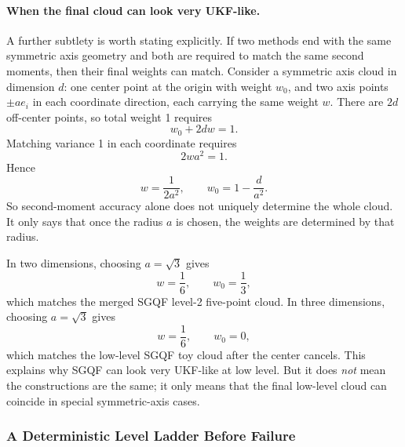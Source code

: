\documentclass[11pt]{article}
\numberwithin{equation}{section}
\begin{document}
\paragraph{When the final cloud can look very UKF-like.}
A further subtlety is worth stating explicitly.  If two methods end with the same
symmetric axis geometry and both are required to match the same second moments,
then their final weights can match.  Consider a symmetric axis cloud in dimension
\(d\): one center point at the origin with weight \(w_0\), and two axis points
\(\pm a e_i\) in each coordinate direction, each carrying the same weight
\(w\).  There are \(2d\) off-center points, so total weight 1 requires
\begin{equation}
  w_0 + 2dw = 1.
  \label{eq:p42-axis-cloud-total-weight}
\end{equation}
Matching variance 1 in each coordinate requires
\begin{equation}
  2wa^2 = 1.
  \label{eq:p42-axis-cloud-second-moment}
\end{equation}
Hence
\begin{equation}
  w = \frac{1}{2a^2},
  \qquad
  w_0 = 1-\frac{d}{a^2}.
  \label{eq:p42-axis-cloud-weights-solved}
\end{equation}
So second-moment accuracy alone does not uniquely determine the whole cloud.  It
only says that once the radius \(a\) is chosen, the weights are determined by
that radius.

In two dimensions, choosing \(a=\sqrt3\) gives
\begin{equation}
  w = \frac16,
  \qquad
  w_0 = \frac13,
  \label{eq:p42-axis-cloud-2d-weights}
\end{equation}
which matches the merged SGQF level-2 five-point cloud.  In three dimensions,
choosing \(a=\sqrt3\) gives
\begin{equation}
  w = \frac16,
  \qquad
  w_0 = 0,
  \label{eq:p42-axis-cloud-3d-weights}
\end{equation}
which matches the low-level SGQF toy cloud after the center cancels.  This
explains why SGQF can look very UKF-like at low level.  But it does \emph{not}
mean the constructions are the same; it only means that the final low-level cloud
can coincide in special symmetric-axis cases.

\subsubsection{A Deterministic Level Ladder Before Failure}
\label{subsec:p32-level-ladder}
\end{document}
